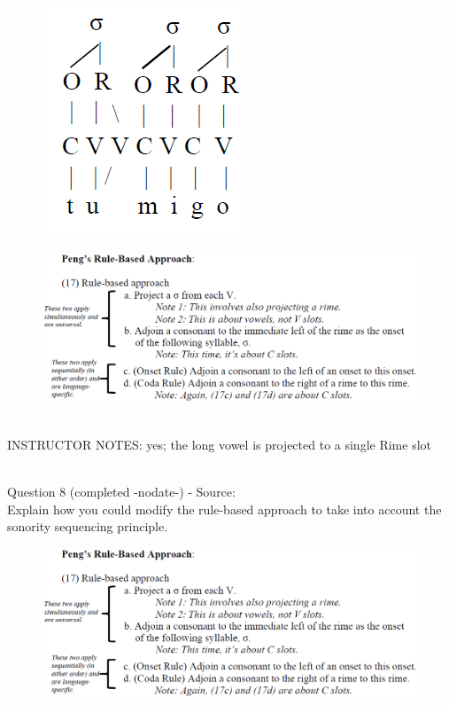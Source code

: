 \documentclass[12pt]{article}
\begin{document}
\begin{figure}[H]
\includegraphics{../images/pengrules_tuumigo_yes.png}
\end{figure}
\begin{figure}[H]
\includegraphics{../images/peng_rules.png}
\end{figure}

~\\
INSTRUCTOR NOTES: yes; the long vowel is projected to a single Rime slot


~\\

{\large Question 8} (completed -nodate-) - Source: \\

Explain how you could modify the rule-based approach to take into account the sonority sequencing principle.\\

\begin{figure}[H]
\includegraphics{../images/peng_rules.png}
\end{figure}
\end{document}
